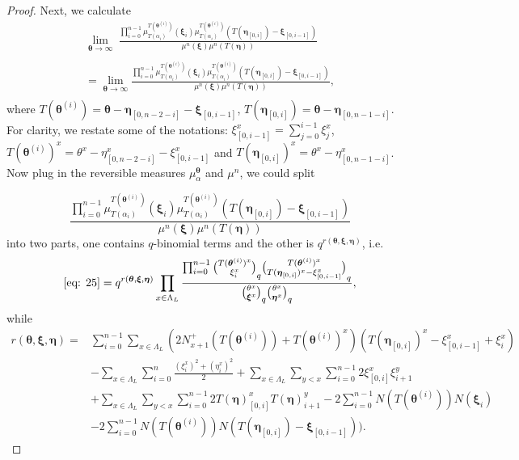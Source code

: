 \documentclass{ximera}
\begin{document}
\begin{proof}
Next, we calculate
\begin{multline*}
 \lim_{\boldsymbol\theta\xrightarrow[]{}\infty}\  \frac{\prod_{i=0}^{n-1}\mu_{T(\alpha_i)}^{T(\boldsymbol\theta^{(i)})}(\boldsymbol\xi_i)\mu_{T(\alpha_i)}^{T(\boldsymbol\theta^{(i)})}(T(\boldsymbol\eta_{[0,i]})-\boldsymbol\xi_{[0,i-1]})}{\mu^n(\boldsymbol\xi) \mu^n(T(\boldsymbol\eta))}\\
=\lim_{\boldsymbol\theta\xrightarrow[]{}\infty} \frac{\prod_{i=0}^{n-1}\mu_{T(\alpha_i)}^{T(\boldsymbol\theta^{(i)})}(\boldsymbol\xi_i)\mu_{T(\alpha_i)}^{T(\boldsymbol\theta^{(i)})}(T(\boldsymbol\eta_{[0,i]})-\boldsymbol\xi_{[0,i-1]})}{\mu^n(\boldsymbol\xi) \mu^n(T(\boldsymbol\eta))}   ,
\end{multline*}
where 
$T(\boldsymbol\theta^{(i)})=\boldsymbol\theta-\boldsymbol\eta_{[0,n-2-i]}-\boldsymbol\xi_{[0,i-1]}$, $T(\boldsymbol\eta_{[0,i]})=\boldsymbol\theta-\boldsymbol\eta_{[0,n-1-i]}$.
    For clarity, we restate some of the notations: $\xi^x_{[0,i-1]}=\sum_{j=0}^{i-1}\xi_j^x$,  $T(\boldsymbol\theta^{(i)})^x=\theta^x-\eta^x_{[0,n-2-i]}-\xi^x_{[0,i-1]}$ and $T(\boldsymbol\eta_{[0,i]})^x=\theta^x-\eta^x_{[0,n-1-i]}$.
Now plug in the reversible measures $\mu_\alpha^{\boldsymbol\theta}$ and $\mu^n$, we could split


\begin{equation}\label{eq: 25}
\frac{\prod_{i=0}^{n-1}\mu_{T(\alpha_i)}^{T(\boldsymbol\theta^{(i)})}(\boldsymbol\xi_i)\mu_{T(\alpha_i)}^{T(\boldsymbol\theta^{(i)})}(T(\boldsymbol\eta_{[0,i]})-\boldsymbol\xi_{[0,i-1]})}{\mu^n(\boldsymbol\xi) \mu^n(T(\boldsymbol\eta))}   
\end{equation}into two parts,  one contains $q$-binomial terms and the other is $q^{ r(\boldsymbol\theta,\boldsymbol\xi,\boldsymbol\eta)}$, i.e.
$$\eqref{eq: 25}=q^{ r(\boldsymbol\theta,\boldsymbol\xi,\boldsymbol\eta)}\prod_{x \in \Lambda_L }\frac{\prod_{i=0}^{n-1}\binom{T(\boldsymbol\theta^{(i)})^x}{\xi_i^x}_q \binom{T(\boldsymbol\theta^{(i)})^x}{T(\boldsymbol\eta_{[0,i]})^x-\xi^x_{[0,i-1]}}_q}{\binom{\theta^x}{\boldsymbol\xi^x}_q\binom{\theta^x}{\boldsymbol\eta^x}_q},$$
while
\begin{align*}
   r(\boldsymbol\theta,\boldsymbol\xi,\boldsymbol\eta) = & \sum_{i=0}^{n-1}  \sum_{x \in \Lambda_L } (2N_{x+1}^+(T(\boldsymbol\theta^{(i)}))+T(\boldsymbol\theta^{(i)})^x)(T(\boldsymbol\eta_{[0,i]})^x-\xi_{[0,i-1]}^x+\xi_i^x)\\
   &-\sum_{x \in \Lambda_L }\sum_{i=0}^{n}\frac{(\xi_i^x)^2+(\eta_i^x)^2}{2}
        +\sum_{x \in \Lambda_L }\sum_{y<x}\sum_{i=0}^{n-1}2\xi^x_{[0,i]}\xi_{i+1}^y\\
        &+\sum_{x \in \Lambda_L }\sum_{y<x}\sum_{i=0}^{n-1}2T(\boldsymbol\eta)^x_{[0,i]}T(\boldsymbol\eta)_{i+1}^y-2\sum_{i=0}^{n-1}N(T(\boldsymbol\theta^{(i)}))N(\boldsymbol\xi_i)\\ &
  -2\sum_{i=0}^{n-1}N(T(\boldsymbol\theta^{(i)}))N(T(\boldsymbol\eta_{[0,i]})-\boldsymbol\xi_{[0,i-1]})).   
\end{align*}


\end{proof}
\end{document}
